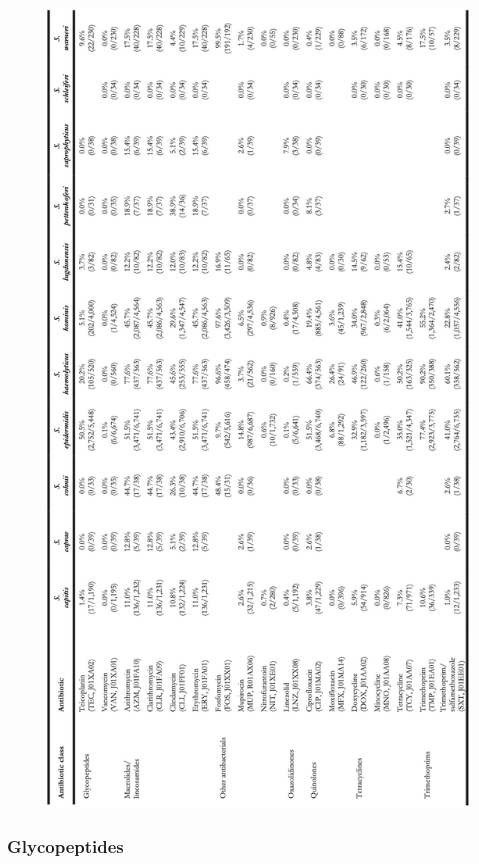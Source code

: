 \documentclass[
]{book}
\begin{document}
\begin{figure}

{\centering \includegraphics[width=1\linewidth]{images/07-t04b} 

}

\end{figure}

\hypertarget{glycopeptides}{%
\subsubsection{Glycopeptides}\label{glycopeptides}}
\end{document}
